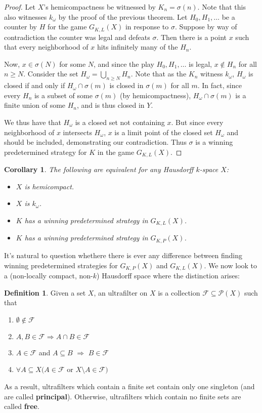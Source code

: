 \documentclass[11pt]{article}
\theoremstyle{plain}
\newtheorem{corollary}[theorem]{Corollary}
\theoremstyle{definition}
\newtheorem{definition}[theorem]{Definition}
\theoremstyle{remark}
\begin{document}
\begin{proof}
Let $X$'s hemicompactness be witnessed by $K_n=\sigma(n)$. Note that this also witnesses $k_\omega$ by the proof of the previous theorem. Let $H_0,H_1,\dots$ be a counter by $H$ for the game $G_{K,L}(X)$ in response to $\sigma$. Suppose by way of contradiction the counter was legal and defeats $\sigma$. Then there is a point $x$ such that every neighborhood of $x$ hits infinitely many of the $H_n$.

Now, $x\in\sigma(N)$ for some $N$, and since the play $H_0,H_1,\dots$ is legal, $x\not\in H_n$ for all $n\geq N$. Consider the set $H_\omega=\bigcup_{n\geq N} H_n$. Note that as the $K_n$ witness $k_\omega$, $H_\omega$ is closed if and only if $H_\omega \cap \sigma(m)$ is closed in $\sigma(m)$ for all $m$. In fact, since every $H_n$ is a subset of some $\sigma(m)$ (by hemicompactness), $H_\omega \cap \sigma(m)$ is a finite union of some $H_n$, and is thus closed in $Y$.

We thus have that $H_\omega$ is a closed set not containing $x$. But since every neighborhood of $x$ intersects $H_\omega$, $x$ is a limit point of the closed set $H_\omega$ and should be included, demonstrating our contradiction. Thus $\sigma$ is a winning predetermined strategy for $K$ in the game $G_{K,L}(X)$.
\end{proof}

\begin{corollary}
The following are equivalent for any Hausdorff $k$-space $X$:
  \begin{itemize}
  \item $X$ is hemicompact.
  \item $X$ is $k_{\omega}$.
  \item $K$ has a winning predetermined strategy in $G_{K,L}(X)$.
  \item $K$ has a winning predetermined strategy in $G_{K,P}(X)$.
  \end{itemize}
\end{corollary}

It's natural to question whethere there is ever any difference between finding winning predetermined strategies for $G_{K,P}(X)$ and $G_{K,L}(X)$. We now look to a (non-locally compact, non-$k$) Hausdorff space where the distinction arises:

\begin{definition}
Given a set $X$, an ultrafilter on $X$ is a collection $\mathcal{F}\subseteq\mathcal{P}(X)$ such that
    \begin{enumerate}
    \item $\emptyset\not\in \mathcal{F}$
    \item $A,B\in\mathcal{F} \Rightarrow A\cap B \in \mathcal{F}$
    \item $A\in\mathcal{F}$ and $A \subseteq B$ $\Rightarrow$ $B\in\mathcal{F}$
    \item $\forall A \subseteq X(A\in\mathcal{F}$ or $X\setminus A \in \mathcal{F})$
    \end{enumerate}
As a result, ultrafilters which contain a finite set contain only one singleton (and are called \textbf{principal}). Otherwise, ultrafilters which contain no finite sets are called \textbf{free}.
\end{definition}
\end{document}
